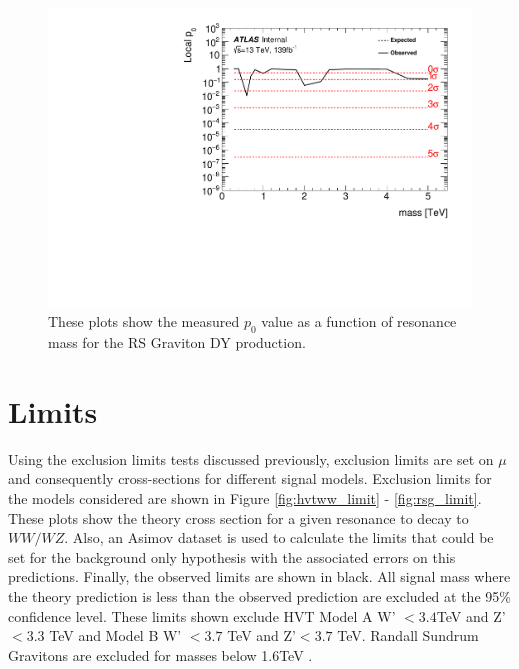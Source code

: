 \begin{figure}[h!]
  \centering
  \includegraphics[width=\hsize]{figures/results/pvalues/fixed_pvalues/rsg_pvalue.pdf}
 \caption{These plots show the measured $p_{0}$ value as a function of resonance mass for the RS Graviton DY production.} 
  \label{fig:discov_rsg}
\end{figure} 
\FloatBarrier


\section{Limits}
Using the exclusion limits tests discussed previously, exclusion limits are set on $\mu$ and consequently cross-sections for different signal models. Exclusion limits for the models considered are shown in Figure \ref{fig:hvtww_limit} - \ref{fig:rsg_limit}. These plots show the theory cross section for a given resonance to decay to $WW/WZ$. Also, an Asimov dataset is used to calculate the limits that could be set for the background only hypothesis with the associated errors on this predictions. Finally, the observed limits are shown in black. All signal mass where the theory prediction is less than the observed prediction are excluded at the 95\% confidence level. These limits shown exclude HVT Model A W' $< 3.4$TeV and Z' $< 3.3$ TeV and Model B W' $< 3.7$ TeV and Z'$ < 3.7$ TeV. Randall Sundrum Gravitons are excluded for masses below 1.6TeV .


